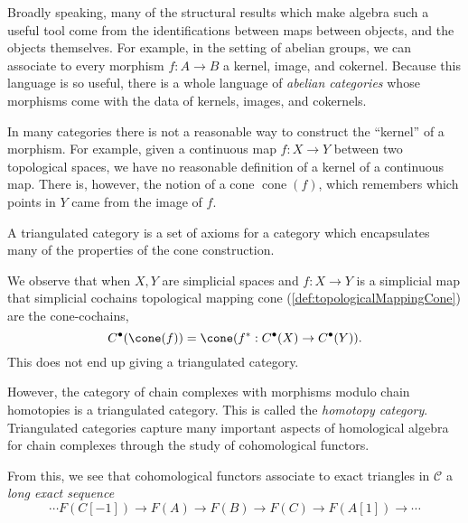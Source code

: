 
Broadly speaking, many of the structural results which make algebra such a useful tool come from the identifications between maps between objects, and the objects themselves. For example, in the setting of abelian groups, we can associate to every morphism $f: A\to B$ a kernel, image, and cokernel. Because this language is so useful, there is a whole language of \emph{abelian categories} whose morphisms come with the data of kernels, images, and cokernels.

In many categories there is not a reasonable way to construct the ``kernel'' of a morphism. For example, given a continuous map $f: X\to Y$ between two topological spaces, we have no reasonable definition of a kernel of a continuous map. There is, however, the notion of a cone $\operatorname{cone}(f)$, which remembers which points in $Y$ came from the image of $f$. 


A triangulated category is a set of axioms for a category which encapsulates many of the properties of the cone construction. 


We observe that when $X, Y$ are simplicial spaces and $f:X\to Y$ is a simplicial map that simplicial cochains topological mapping cone (\cref{def:topologicalMappingCone}) are the cone-cochains,
\[C^\bullet(\cone(f))=\cone(f^*:C^\bullet(X)\to C^\bullet(Y)).\]
This does not end up giving a triangulated category.

However, the category of chain complexes with morphisms modulo chain homotopies is a triangulated category. This is called the \emph{homotopy category}.
Triangulated categories capture many important aspects of homological algebra for chain complexes through the study of cohomological functors. 

From this, we see that cohomological functors associate to exact triangles in $\mathcal C$ a \emph{long exact sequence}
\[\cdots F(C[-1])\to F(A)\to F(B)\to F(C)\to F(A[1])\to \cdots \]




